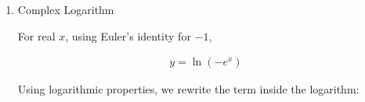\begin{enumerate}[label=\thesubsection.\arabic*,ref=\thesubsection.\theenumi]
Multiplying numerator and denominator by the complex conjugate $(\omega R_2 C + j)$:
\begin{align}
Z_p(\omega) &= \frac{-j R_2 (\omega R_2 C + j)}{(\omega R_2 C - j)(\omega R_2 C + j)}\\
&= \frac{R_2 - j \omega R_2^2 C}{1 + (\omega R_2 C)^2}
\end{align}

The total input impedance $Z_{\text{in}}(\omega)$ in series with $R_1$ is:
\begin{align}
Z_{\text{in}}(\omega) &= R_1 + Z_p(\omega)\\
&= \left( R_1 + \frac{R_2}{1 + (\omega R_2 C)^2} \right) - j \left( \frac{\omega R_2^2 C}{1 + (\omega R_2 C)^2} \right)
\end{align}



\begin{align}
|Z_{\text{in}}(\omega)| = \sqrt{ \left[ R_1 + \frac{R_2}{1 + (\omega R_2 C)^2} \right]^2 + \left[ \frac{\omega R_2^2 C}{1 + (\omega R_2 C)^2} \right]^2 }
\end{align}

Simplifying the algebraic expression:
\begin{align}
|Z_{\text{in}}(\omega)| = \sqrt{ R_1^2 + \frac{2 R_1 R_2 + R_2^2 + (\omega R_1 R_2 C)^2}{1 + (\omega R_2 C)^2} }
\end{align}

\begin{align}
\angle Z_{\text{in}}(\omega) &= -\tan^{-1}\left( \frac{\frac{\omega R_2^2 C}{1 + (\omega R_2 C)^2}}{R_1 + \frac{R_2}{1 + (\omega R_2 C)^2}} \right)\\
& = -\tan^{-1}\left( \frac{\omega R_2^2 C}{R_1(1 + (\omega R_2 C)^2) + R_2} \right)
\end{align}

\item Complex Logarithm \label{log}

For real $x$, using Euler's identity for $-1$,


\begin{align}
y = \ln(-e^x)
\end{align}

Using logarithmic properties, we rewrite the term inside the logarithm:


\end{enumerate}
